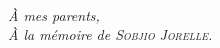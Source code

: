 
\begin{flushright}
\textit{\\[7cm]
\`A mes parents,\\ [0.5cm]
\`A la mémoire de \textsc{Sobjio Jorelle}.
}
\end{flushright}

\myCleanStarChapterEnd
